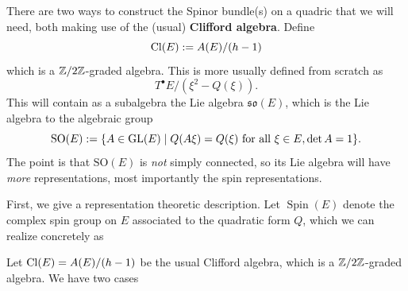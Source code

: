 \documentclass[12pt]{article}
\DeclareMathOperator{\Spin}{Spin}
\begin{document}
There are two ways to construct the Spinor bundle(s) on a quadric that we will need, both making use of the (usual) \textbf{Clifford algebra}. Define
\[\operatorname{Cl}(E) := A(E)/(h-1)\]
which is a $\mathbb{Z}/2\mathbb{Z}$-graded algebra. This is more usually defined from scratch as
\[T^\bullet E/(\xi^2 - Q(\xi)).\]
This will contain as a subalgebra the Lie algebra $\mathfrak{so}(E)$, which is the Lie algebra to the algebraic group
\[\mathrm{SO}(E) := \{A\in \mathrm{GL}(E) \mid Q(A\xi) = Q(\xi) \text{ for all } \xi \in E, \det A = 1\}.\]
The point is that $\mathrm{SO}(E)$ is \textit{not} simply connected, so its Lie algebra will have \textit{more} representations, most importantly the spin representations.

First, we give a representation theoretic description. Let $\Spin(E)$ denote the complex spin group on $E$ associated to the quadratic form $Q$, which we can realize concretely as



Let $\operatorname{Cl}(E) = A(E)/(h-1)$ be the usual Clifford algebra, which is a $\mathbb{Z}/2\mathbb{Z}$-graded algebra. We have two cases



\nocite{*} %
\end{document}
